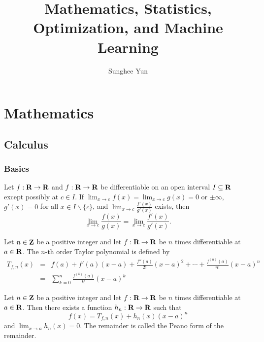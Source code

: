 \documentclass[10pt, twoside]{book}   	%
\title{Mathematics, Statistics, Optimization, and Machine Learning}
\author{Sunghee Yun}
\begin{document}
\maketitle

\tableofcontents

\newpage

\part{Mathematics}

\chapter{Calculus}

\section{Basics}

\begin{theorem}
Let $f:{\mbox{\bf R}}\to{\mbox{\bf R}}$ and $f:{\mbox{\bf R}}\to{\mbox{\bf R}}$ be differentiable on an open interval $I\subseteq {\mbox{\bf R}}$
except possibly at $c\in I$.
If $\lim_{x\to c} f(x) = \lim_{x\to c} g(x) = 0$ or $\pm \infty$,
$g'(x)=0$ for all $x\in I\backslash \{c\}$,
and $\lim_{x\to c} \frac{f'(x)}{g'(x)}$ exists,
then
\begin{equation}
\label{eq:lhopital-rule}
\lim_{x\to c} \frac{f(x)}{g(x)}
= \lim_{x\to c} \frac{f'(x)}{g'(x)}.
\end{equation}
\end{theorem}

\begin{definition}
Let $n\in{\mbox{\bf Z}}$ be a positive integer and
let $f:{\mbox{\bf R}}\to{\mbox{\bf R}}$ be $n$ times differentiable at $a\in{\mbox{\bf R}}$.
The $n$-th order Taylor polynomial is defined by
\begin{eqnarray}
T_{f,n}(x) &=& f(a) + f'(a)(x-a)
+ \frac{f''(a)}{2!}(x-a)^2
+ \cdots
+ \frac{f^{(n)}(a)}{n!}(x-a)^n
\nonumber
\\
&=&
\sum_{k=0}^n \frac{f^{(k)}(a)}{k!} (x-a)^k
\label{eq:taylor-poly}
\end{eqnarray}
\end{definition}


\begin{theorem}
\label{theorem:taylor-peano}
Let $n\in{\mbox{\bf Z}}$ be a positive integer and
let $f:{\mbox{\bf R}}\to{\mbox{\bf R}}$ be $n$ times differentiable at $a\in{\mbox{\bf R}}$.
Then there exists a function $h_n:{\mbox{\bf R}}\to{\mbox{\bf R}}$ such that
\begin{equation}
\label{eq:taylor-peano}
f(x) = T_{f,n}(x) + h_n(x) (x-a)^n
\end{equation}
and $\lim_{x\to a} h_n(x)=0$.
The remainder is called the Peano form of the remainder.
\end{theorem}
\end{document}
